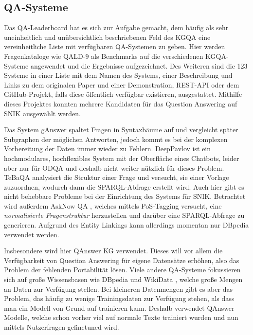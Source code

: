 \documentclass[utf8,biblatex]{lni}
\begin{document}
\subsection{QA-Systeme}

Das QA-Leaderboard \citep{leaderboardinproceedings} hat es sich zur Aufgabe gemacht,
dem häufig als sehr uneinheitlich und unübersichtlich \citep{diefenbachkbqa} beschriebenen Feld des KGQA eine vereinheitliche Liste mit verfügbaren QA-Systemen zu geben.
Hier werden Fragenkataloge wie QALD-9 als Benchmarks auf die verschiedenen KGQA-Systeme angewendet und die Ergebnisse aufgezeichnet.
Des Weiteren sind die 123 Systeme in einer Liste mit dem Namen des Systems, einer Beschreibung und Links zu dem originalen Paper und einer Demonstration,
REST-API oder dem GitHub-Projekt, falls diese öffentlich verfügbar existieren, ausgestattet.
Mithilfe dieses Projektes konnten mehrere Kandidaten für das Question Answering auf SNIK ausgewählt werden.

Das System gAnswer \cite{ganswerapproach} spaltet Fragen in Syntaxbäume auf und vergleicht später Subgraphen der möglichen Antworten, jedoch kommt es bei der komplexen Vorbereitung der Daten immer wieder zu Fehlern.
DeepPavlov \cite{deeppavlov} ist ein hochmodulares, hochflexibles System mit der Oberfläche eines Chatbots, leider aber nur für ODQA und deshalb nicht weiter nützlich für dieses Problem.
TeBaQA \cite{tebaqa} analysiert die Struktur einer Frage und versucht, sie einer Vorlage zuzuordnen, wodurch dann die SPARQL-Abfrage erstellt wird.
Auch hier gibt es nicht behebbare Probleme bei der Einrichtung des Systems für SNIK.
Betrachtet wird außerdem AskNow QA \cite{asknow}, welches mittels PoS-Tagging versucht, eine \emph{normalisierte Fragenstruktur} herzustellen und darüber eine SPARQL-Abfrage zu generieren.
Aufgrund des Entity Linkings kann allerdings momentan nur DBpedia verwendet werden.

Insbesondere wird hier QAnswer KG \cite{qanswer} verwendet.
Dieses will vor allem die Verfügbarkeit von Question Answering für eigene Datensätze erhöhen,
also das Problem der fehlenden Portabilität lösen.
Viele andere QA-Systeme fokussieren sich auf große Wissensbasen wie DBpedia und WikiData \cite{qald9plus},
welche große Mengen an Daten zur Verfügung stellen.
Bei kleineren Datenmengen gibt es aber das Problem, das häufig zu wenige Trainingsdaten zur Verfügung stehen, als dass man ein Modell von Grund auf trainieren kann.
Deshalb verwendet QAnswer Modelle, welche schon vorher viel auf normale Texte trainiert wurden und nun mittels Nutzerfragen gefinetuned wird.
\end{document}
